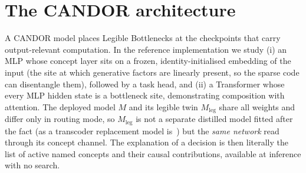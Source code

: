 \documentclass[11pt]{article}
\begin{document}
\section{The CANDOR architecture}
\label{sec:arch}
A CANDOR model places Legible Bottlenecks at the checkpoints that carry
output-relevant computation. In the reference implementation we study (i) an MLP whose
concept layer sits on a frozen, identity-initialised embedding of the input (the site
at which generative factors are linearly present, so the sparse code can disentangle
them), followed by a task head, and (ii) a Transformer whose every MLP hidden state is
a bottleneck site, demonstrating composition with attention. The deployed model $M$ and
its legible twin $M_{\mathrm{leg}}$ share all weights and differ only in routing mode,
so $M_{\mathrm{leg}}$ is not a separate distilled model fitted after the fact (as a
transcoder replacement model is~\citep{ameisen2025circuit}) but the \emph{same network}
read through its concept channel. The explanation of a decision is then literally the
list of active named concepts and their causal contributions, available at inference
with no search.
\end{document}

